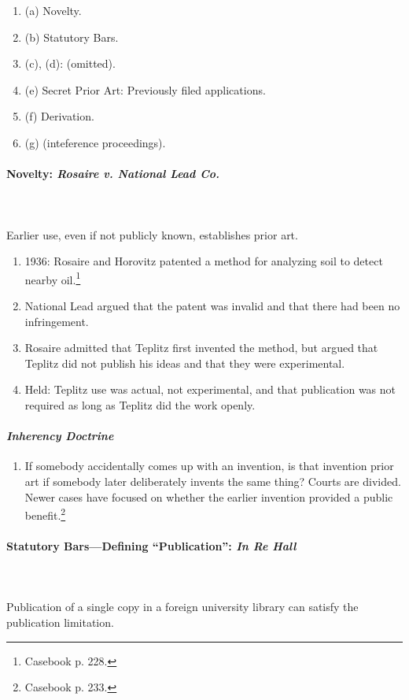 \begin{enumerate}
    \item (a) Novelty.
    \item (b) Statutory Bars.
    \item (c), (d): (omitted).
    \item (e) Secret Prior Art: Previously filed applications.
    \item (f) Derivation.
    \item (g) (inteference proceedings).
\end{enumerate}

\paragraph{Novelty: \emph{Rosaire v. National Lead Co.}}
~\\\\
Earlier use, even if not publicly known, establishes prior art.

\begin{enumerate}
    \item 1936: Rosaire and Horovitz patented a method for analyzing soil to 
    detect nearby oil.\footnote{Casebook p. 228.}
    \item National Lead argued that the patent was invalid and that there had 
    been no infringement.
    \item Rosaire admitted that Teplitz first invented the method, but argued 
    that Teplitz did not publish his ideas and that they were experimental.
    \item Held: Teplitz use was actual, not experimental, and that publication 
    was not required as long as Teplitz did the work openly.
\end{enumerate}

\paragraph{\emph{Inherency Doctrine}} 

\begin{enumerate}
    \item If somebody accidentally comes up with an invention, is that 
    invention prior art if somebody later deliberately invents the same thing? 
    Courts are divided. Newer cases have focused on whether the earlier 
    invention provided a public benefit.\footnote{Casebook p. 233.}
\end{enumerate}

\paragraph{Statutory Bars---Defining ``Publication'': \emph{In Re Hall}}
~\\\\
Publication of a single copy in a foreign university library can satisfy 
the publication limitation.

